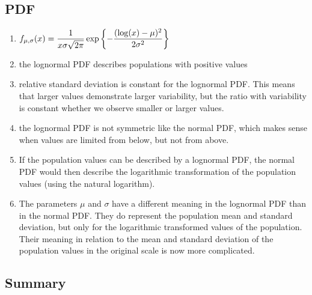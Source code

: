 \subsection{PDF}

\begin{enumerate}
    \item[] $
        f_{\mu, \sigma}(x) = \dfrac{1}{x\sigma \sqrt{2\pi}} \exp\left\{
            -\dfrac{(\log(x) - \mu)^2}{2\sigma^2}
        \right\}
    $
    \hfill \cite{statistics/book/Statistics-for-Data-Scientists/Maurits-Kaptein}

    \item the lognormal PDF describes populations with positive values
    \hfill \cite{statistics/book/Statistics-for-Data-Scientists/Maurits-Kaptein}

    \item relative standard deviation  is constant for the lognormal PDF.
    This means that larger values demonstrate larger variability, but the ratio with variability is constant whether we observe smaller or larger values.
    \hfill \cite{statistics/book/Statistics-for-Data-Scientists/Maurits-Kaptein}

    \item the lognormal PDF is not symmetric like the normal PDF, which makes sense when values are limited from below, but not from above.
    \hfill \cite{statistics/book/Statistics-for-Data-Scientists/Maurits-Kaptein}

    \item  If the population values can be described by a lognormal PDF, the normal PDF would then describe the logarithmic transformation of the population values (using the natural logarithm).
    \hfill \cite{statistics/book/Statistics-for-Data-Scientists/Maurits-Kaptein}

    \item The parameters $\mu$ and $\sigma$ have a different meaning in the lognormal PDF than in the normal PDF.
    They do represent the population mean and standard deviation, but only for the logarithmic transformed values of the population.
    Their meaning in relation to the mean and standard deviation of the population values in the original scale is now more complicated.
    \hfill \cite{statistics/book/Statistics-for-Data-Scientists/Maurits-Kaptein}
\end{enumerate}



\subsection{Summary}

